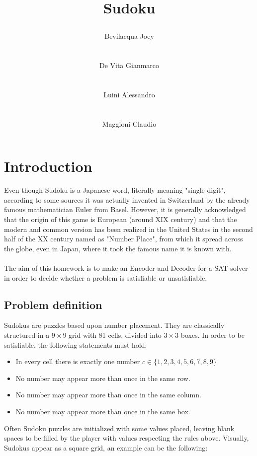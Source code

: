\documentclass[]{usiinfprospectus}
\author{\centerline{Bevilacqua Joey} \\[3pt] \centerline{De Vita Gianmarco}  \\[3pt] \centerline{Luini Alessandro}  \\[3pt] \centerline{Maggioni Claudio}}
\title{\centerline{Sudoku}}
\newcounter{row}
\newcounter{col}
\begin{document}
\maketitle
\tableofcontents
\listoffigures
\newpage
\section{Introduction} \label{introduction}
Even though Sudoku is a Japanese word, literally meaning "single digit", according to some sources it was actually invented in Switzerland by the already famous mathematician Euler from Basel. However, it is generally acknowledged that the origin of this game is European (around XIX century) and that the modern and common version has been realized in the United States in the second half of the XX century named as "Number Place", from which it spread across the globe, even in Japan, where it took the famous name it is known with.\\ \\
The aim of this homework is to make an Encoder and Decoder for a SAT-solver in order to decide whether a problem is satisfiable or unsatisfiable.
\subsection{Problem definition} \label{problem}
Sudokus are puzzles based upon number placement. They are classically structured in a $9\times 9$ grid with 81 cells, divided into $3\times 3$ boxes. In order to be satisfiable, the following statements must hold:
\begin{itemize}%
\item In every cell there is exactly one number $c \in \{1,2,3,4,5,6,7,8,9 \}$
\item No number may appear more than once in the same row.
\item No number may appear more than once in the same column.
\item No number may appear more than once in the same box.
\end{itemize}
Often Sudoku puzzles are initialized with some values placed, leaving blank spaces to be filled by the player with values respecting the rules above. Visually, Sudokus appear as a square grid, an example can be the following:
\end{document}
